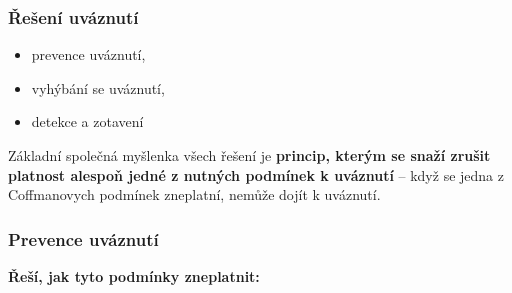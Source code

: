 \documentclass[a4paper, 11pt]{article}
\begin{document}
\subsubsection{Řešení uváznutí}
\begin{itemize}
    \item prevence uváznutí,
    \item vyhýbání se uváznutí,
    \item detekce a zotavení
\end{itemize}
 
Základní společná myšlenka všech řešení je \textbf{princip, kterým se snaží zrušit platnost alespoň jedné z nutných podmínek k uváznutí} -- když se jedna z Coffmanovych podmínek zneplatní, nemůže dojít k uváznutí.

\subsubsection{Prevence uváznutí}
\textbf{Řeší, jak tyto podmínky zneplatnit:}
\end{document}
